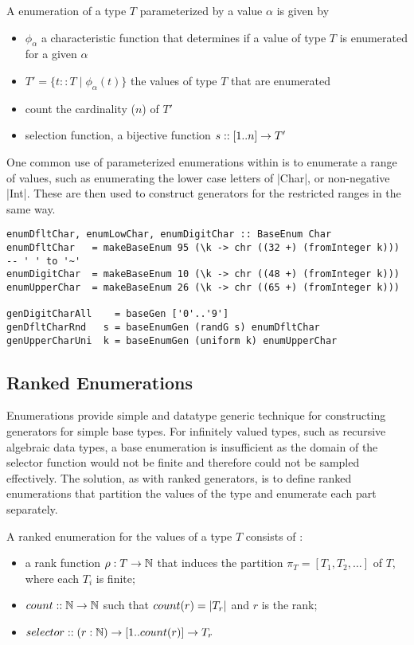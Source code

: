 \begin{df}
A enumeration of a type $T$ parameterized by a value $\alpha$ is given by 
\begin{itemize}
\item $\phi_\alpha$ a characteristic function that determines if a value of type $T$ is enumerated for a given $\alpha$
\item $T' = \{t :: T \mid \phi_\alpha(t)\}$ the values of type $T$ that are enumerated
\item count the cardinality ($n$) of $T'$
\item selection function, a bijective function $s :: [1..n] \rightarrow T'$
\end{itemize}

\end{df}

\noindent
One common use of parameterized enumerations within \GC is to enumerate a range of values,
such as enumerating the lower case letters of |Char|, or non-negative |Int|.
These are then used to construct generators for the restricted ranges in the same way.

\begin{lstlisting}
enumDfltChar, enumLowChar, enumDigitChar :: BaseEnum Char
enumDfltChar   = makeBaseEnum 95 (\k -> chr ((32 +) (fromInteger k))) -- ' ' to '~'
enumDigitChar  = makeBaseEnum 10 (\k -> chr ((48 +) (fromInteger k)))
enumUpperChar  = makeBaseEnum 26 (\k -> chr ((65 +) (fromInteger k)))

genDigitCharAll    = baseGen ['0'..'9']
genDfltCharRnd   s = baseEnumGen (randG s) enumDfltChar
genUpperCharUni  k = baseEnumGen (uniform k) enumUpperChar

\end{lstlisting}


\subsection{Ranked Enumerations}
Enumerations provide simple and datatype generic technique for 
constructing generators for simple base types.
For infinitely valued types, such as recursive algebraic data types,
a base enumeration is insufficient as the domain of the selector function
would not be finite and therefore could not be sampled effectively.
The solution, as with ranked generators, 
is to define ranked enumerations that
partition the values of the type and enumerate each part separately.

\begin{df}

A ranked enumeration for the values of a type $T$ consists of :
\begin{itemize}
\item a rank function $\rho: T \rightarrow \mathbb{N}$ that induces the partition $\pi_{T} = [T_1, T_2, \dots]$ of $T$,
where each $T_i$ is finite;
\item $count :: \mathbb{N} \rightarrow \mathbb{N}$ such that $count(r)  = \lvert T_r\rvert$ and $r$ is the rank;
\item $selector :: (r:\mathbb{N}) \rightarrow [1..count(r)] \rightarrow T_r $ 
\end{itemize}
\end{df}

